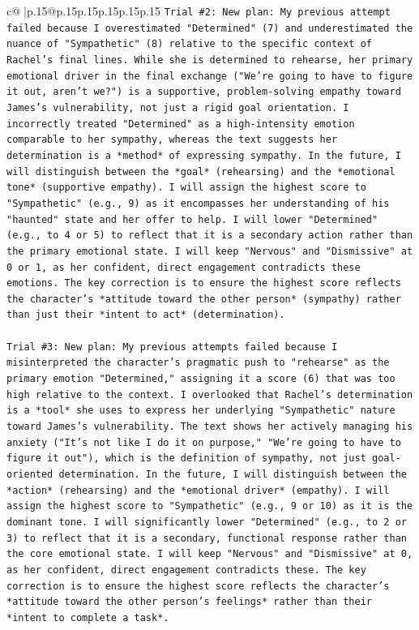 \documentclass{article}
\begin{document}
{\begin{supertabular}{c@{$\;$}|p{.15\linewidth}@{}p{.15\linewidth}p{.15\linewidth}p{.15\linewidth}p{.15\linewidth}p{.15\linewidth}}
{{{\texttt{Trial \#2: New plan: My previous attempt failed because I overestimated "Determined" (7) and underestimated the nuance of "Sympathetic" (8) relative to the specific context of Rachel's final lines. While she is determined to rehearse, her primary emotional driver in the final exchange ("We're going to have to figure it out, aren't we?") is a supportive, problem{-}solving empathy toward James's vulnerability, not just a rigid goal orientation. I incorrectly treated "Determined" as a high{-}intensity emotion comparable to her sympathy, whereas the text suggests her determination is a *method* of expressing sympathy. In the future, I will distinguish between the *goal* (rehearsing) and the *emotional tone* (supportive empathy). I will assign the highest score to "Sympathetic" (e.g., 9) as it encompasses her understanding of his "haunted" state and her offer to help. I will lower "Determined" (e.g., to 4 or 5) to reflect that it is a secondary action rather than the primary emotional state. I will keep "Nervous" and "Dismissive" at 0 or 1, as her confident, direct engagement contradicts these emotions. The key correction is to ensure the highest score reflects the character's *attitude toward the other person* (sympathy) rather than just their *intent to act* (determination).} \\
\\ 
\texttt{Trial \#3: New plan: My previous attempts failed because I misinterpreted the character's pragmatic push to "rehearse" as the primary emotion "Determined," assigning it a score (6) that was too high relative to the context. I overlooked that Rachel's determination is a *tool* she uses to express her underlying "Sympathetic" nature toward James's vulnerability. The text shows her actively managing his anxiety ("It's not like I do it on purpose," "We're going to have to figure it out"), which is the definition of sympathy, not just goal{-}oriented determination. In the future, I will distinguish between the *action* (rehearsing) and the *emotional driver* (empathy). I will assign the highest score to "Sympathetic" (e.g., 9 or 10) as it is the dominant tone. I will significantly lower "Determined" (e.g., to 2 or 3) to reflect that it is a secondary, functional response rather than the core emotional state. I will keep "Nervous" and "Dismissive" at 0, as her confident, direct engagement contradicts these. The key correction is to ensure the highest score reflects the character's *attitude toward the other person's feelings* rather than their *intent to complete a task*.} \\
}}}
\end{supertabular}}
\end{document}
